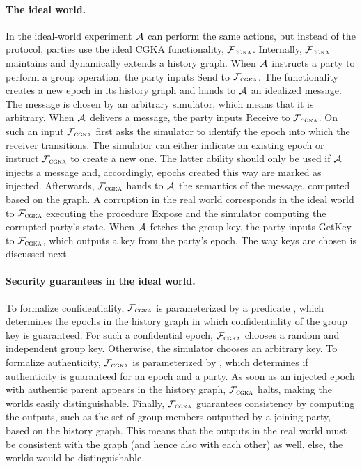 \paragraph{The ideal world.}
In the ideal-world experiment $\mathcal{A}_{\relax}$ can perform the same actions, but instead of the protocol, parties use the ideal
CGKA functionality, $\mathcal{F}_{\normalfont\textsc{cgka}}$. Internally, $\mathcal{F}_{\normalfont\textsc{cgka}}$ maintains and dynamically extends a history graph. When $\mathcal{A}_{\relax}$ instructs a party to perform a group operation, the party inputs Send to $\mathcal{F}_{\normalfont\textsc{cgka}}$. The functionality creates a new epoch in its history graph and hands to $\mathcal{A}_{\relax}$ an idealized message. The message is chosen by an arbitrary simulator, which means that it is arbitrary. When $\mathcal{A}_{\relax}$ delivers a message, the party inputs Receive to $\mathcal{F}_{\normalfont\textsc{cgka}}$. On such an input $\mathcal{F}_{\normalfont\textsc{cgka}}$ first asks the simulator to identify the epoch into which the receiver transitions. The simulator can either indicate an existing epoch or instruct $\mathcal{F}_{\normalfont\textsc{cgka}}$ to create a new one. The latter ability should only be used if $\mathcal{A}_{\relax}$ injects a message and, accordingly, epochs created this way are marked as injected. Afterwards, $\mathcal{F}_{\normalfont\textsc{cgka}}$ hands to $\mathcal{A}_{\relax}$ the semantics of the message, computed based on the graph.
A corruption in the real world corresponds in the ideal world to $\mathcal{F}_{\normalfont\textsc{cgka}}$ executing the procedure Expose and the simulator computing the corrupted party's state. When $\mathcal{A}_{\relax}$ fetches the group key, the party inputs GetKey to $\mathcal{F}_{\normalfont\textsc{cgka}}$, which outputs a key from the party's epoch. The way keys are chosen is discussed next.

\paragraph{Security guarantees in the ideal world.}
To formalize confidentiality, $\mathcal{F}_{\normalfont\textsc{cgka}}$ is parameterized by a predicate \KwConf{}, which determines the epochs in the history graph in which confidentiality of the group key is guaranteed. For such a confidential epoch, $\mathcal{F}_{\normalfont\textsc{cgka}}$ chooses a random and independent group key. Otherwise, the simulator chooses an arbitrary key. To formalize authenticity, $\mathcal{F}_{\normalfont\textsc{cgka}}$ is parameterized by \KwAuth{}, which determines if authenticity is guaranteed for an epoch and a party. As soon as an injected epoch with authentic parent appears in the history graph, $\mathcal{F}_{\normalfont\textsc{cgka}}$ halts, making the worlds easily distinguishable. Finally, $\mathcal{F}_{\normalfont\textsc{cgka}}$ guarantees consistency by computing the outputs, such as the set of group members outputted by a joining party, based on the history graph. This means that the outputs in the real world must be consistent with the graph (and hence also with each other) as well, else, the worlds would be distinguishable.

